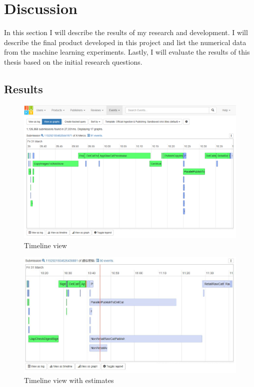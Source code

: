 
\clearpage
\section{Discussion}
\label{sec:discussion}

In this section I will describe the results of my research and development.
I will describe the final product developed in this project and list the numerical data from the machine learning experiments.
Lastly, I will evaluate the results of this thesis based on the initial research questions.

\subsection{Results}
\label{sec:results}


\begin{figure}[htb]
\centering \includegraphics[width=\linewidth]{gfx/screenshots/timeline.png}
\caption{Timeline view \label{fig:timeline}}
\end{figure}

\begin{figure}[htb]
\centering \includegraphics[width=\linewidth]{gfx/screenshots/estimates.jpg}
\caption{Timeline view with estimates \label{fig:estimates}}
\end{figure}

